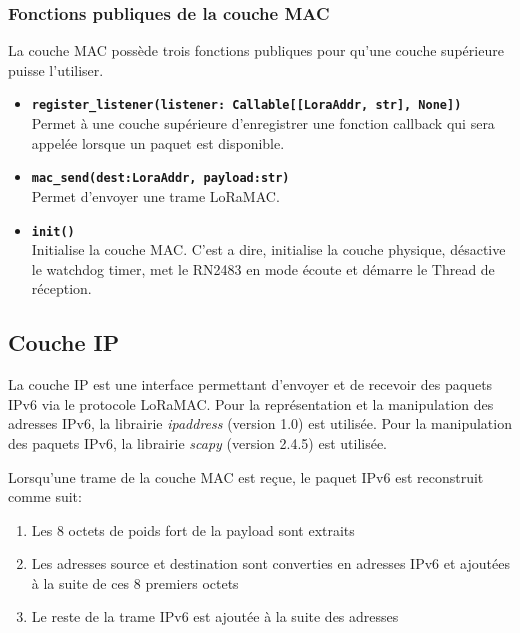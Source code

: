     \subsubsection*{Fonctions publiques de la couche MAC}
        La couche MAC possède trois fonctions publiques pour qu'une couche supérieure puisse l'utiliser.
        \begin{itemize}
            \item \textbf{\texttt{register\_listener(listener: Callable[[LoraAddr, str], None])}}\\
                Permet à une couche supérieure d'enregistrer une fonction callback qui sera appelée lorsque un paquet est disponible.
            \item \textbf{\texttt{mac\_send(dest:LoraAddr, payload:str)}}\\
                Permet d'envoyer une trame LoRaMAC.
            \item \textbf{\texttt{init()}}\\
                Initialise la couche MAC. C'est a dire, initialise la couche physique,
                désactive le watchdog timer, met le RN2483 en mode écoute et démarre le Thread de réception.
        \end{itemize}
        
\subsection*{Couche IP}\label{subsec:work-loraroot:iplayer}
        La couche IP est une interface permettant d'envoyer et de recevoir des paquets IPv6 via le protocole LoRaMAC. Pour la représentation et la manipulation des adresses IPv6, la librairie \textit{ipaddress} (version 1.0) est utilisée. Pour la manipulation des paquets IPv6, la librairie \textit{scapy} (version 2.4.5) est utilisée.

        Lorsqu'une trame de la couche MAC est reçue, le paquet IPv6 est reconstruit comme suit:
        \begin{enumerate}
            \item Les 8 octets de poids fort de la payload sont extraits
            \item Les adresses source et destination sont converties en adresses IPv6 et ajoutées à la suite de ces 8 premiers octets
            \item Le reste de la trame IPv6 est ajoutée à la suite des adresses
        \end{enumerate}
        
